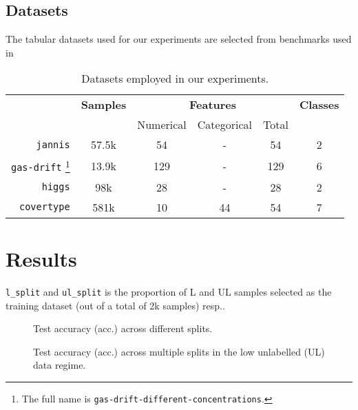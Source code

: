 \documentclass{article}
\begin{document}
\subsection{Datasets}

The tabular datasets used for our experiments are selected from benchmarks used in

\begin{table}[htbp]
  \centering
  \caption{Datasets employed in our experiments.}
  \begin{tabular}{rccccc}
    \toprule
    & \textbf{Samples} & \multicolumn{3}{c}{\textbf{Features}} & \textbf{Classes} \\
    \cmidrule(lr){3-5}
    & & Numerical & Categorical & Total \\
    \midrule
    \small\texttt{jannis} & 57.5k & 54 & - & 54 & 2 \\
    \small\texttt{gas-drift}%
    \footnote{The full name is \texttt{gas-drift-different-concentrations}.}
    & 13.9k & 129 & - & 129 & 6 \\
    \small\texttt{higgs} & 98k & 28 & - & 28 & 2 \\
    \small\texttt{covertype} & 581k & 10 & 44 & 54 & 7 \\
    \bottomrule
  \end{tabular}
  \label{tab:datasets}
\end{table}

\section{Results}\label{sec:res}

\texttt{l\_split} and \texttt{ul\_split} is the proportion of L and UL samples
selected as the training dataset (out of a total of 2k samples) resp..

\begin{figure}[htbp]
  \centering
  
  
  
  
  \caption{Test accuracy (acc.) across different splits.}
  \label{fig:ul_split_vs_l_split}
\end{figure}

\begin{figure}[htbp]
  \centering
  
  
  
  
  \caption{
    Test accuracy (acc.) across multiple splits in the low unlabelled (UL) data regime.
  }
  \label{fig:test_acc_vs_ul_split_low}
\end{figure}
\end{document}
